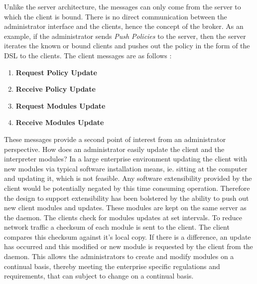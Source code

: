 		\normalsize
		{
			Unlike the server architecture, the messages can only come from the server to which the client is bound.
			There is no direct communication between the administrator interface and the clients, hence the concept of the broker.
			As an example, if the administrator sends  \textit{Push Policies} to the server, then the server iterates the known or 
			bound clients and pushes out the policy in the form of the DSL to the clients.
			\newline
			\newline				
			The client messages are as follows :
			
			\vspace{-3mm}
			\begin{multicols}{2}
			
				\begin{enumerate}[itemsep=1pt,parsep=1pt]
					\item \textbf{Request Policy Update}
					\item \textbf{Receive Policy Update}
					\item \textbf{Request Modules Update}
					\item \textbf{Receive Modules Update} 
				\end{enumerate}	
				
			\end{multicols}

			These messages provide a second point of interest from an administrator perspective.
			How does an administrator easily update the client and the interpreter modules?
			In a large enterprise environment updating the client with new modules via typical software installation
			means, ie. sitting at the computer and updating it, which is not feasible.  Any software extensibility provided by the client
			would be potentially negated by this time consuming operation.   Therefore the design to support extensibility
			has been bolstered by the ability to push out new client modules and updates. 
			\newline			
			\newline
			These modules are kept on the same server as the daemon.  The clients check for modules updates at set intervals.
			To reduce network traffic a checksum of each module is sent to the client. The client compares this checksum against it's local copy.
			If there is a difference, an update has occurred and this modified or new module is requested by the client from the daemon.
			\newline
			\newline
			This allows the administrators to create and modify modules on a continual basis, thereby meeting the enterprise specific 
			regulations and requirements, that can subject to change on a continual basis.
			\newline
		}		
	
